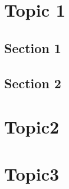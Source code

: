 \appendix
{}
\chapter{Topic 1}
\section{Section 1}
\section{Section 2}
\chapter{Topic2}
\label{sec:topic2}
\newpage
\chapter{Topic3}
\label{chap:topic3}

